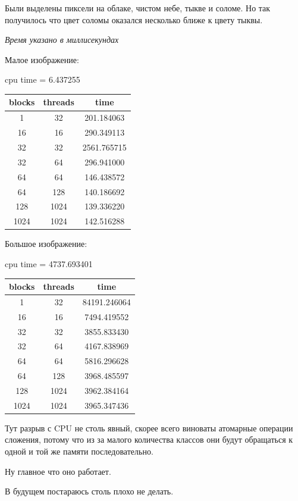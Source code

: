 \documentclass[12pt]{article}
\begin{document}
Были выделены пиксели на облаке, чистом небе, тыкве и соломе.
Но так получилось что цвет соломы оказался несколько ближе к цвету тыквы.

\newpage

\textit{Время указано в миллисекундах}

Малое изображение:

\begin{center}
	cpu time = 6.437255
	\begin{table}[!htb]
		\centering
		\begin{tabular}{|c|c|c|}
			\hline
			blocks & threads & time        \\
			\hline

			1      & 32      & 201.184063  \\
			16     & 16      & 290.349113  \\
			32     & 32      & 2561.765715 \\
			32     & 64      & 296.941000  \\
			64     & 64      & 146.438572  \\
			64     & 128     & 140.186692  \\
			128    & 1024    & 139.336220  \\
			1024   & 1024    & 142.516288  \\
			\hline
		\end{tabular}
	\end{table}
\end{center}

Большое изображение:

\begin{center}
	cpu time = 4737.693401
	\begin{table}[!htb]
		\centering
		\begin{tabular}{|c|c|c|}
			\hline
			blocks & threads & time         \\
			\hline

			1      & 32      & 84191.246064 \\
			16     & 16      & 7494.419552  \\
			32     & 32      & 3855.833430  \\
			32     & 64      & 4167.838969  \\
			64     & 64      & 5816.296628  \\
			64     & 128     & 3968.485597  \\
			128    & 1024    & 3962.384164  \\
			1024   & 1024    & 3965.347436  \\
			\hline
		\end{tabular}
	\end{table}
\end{center}


Тут разрыв с CPU не столь явный, скорее всего виноваты атомарные операции сложения,
потому что из за малого количества классов они будут обращаться к одной и той же памяти
последовательно.

Ну главное что оно работает.

В будущем постараюсь столь плохо не делать.
\end{document}
